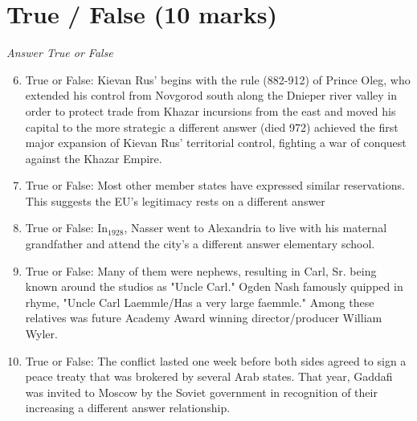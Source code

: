 \documentclass[12pt]{article}
\begin{document}
\section*{True / False (10 marks)}
\textit{Answer True or False}
\begin{enumerate}[label=\arabic*.]
\setcounter{enumi}{5}
\item True or False: Kievan Rus' begins with the rule (882-912) of Prince Oleg, who extended his control from Novgorod south along the Dnieper river valley in order to protect trade from Khazar incursions from the east and moved his capital to the more strategic a different answer (died 972) achieved the first major expansion of Kievan Rus' territorial control, fighting a war of conquest against the Khazar Empire.
\item True or False: Most other member states have expressed similar reservations. This suggests the EU's legitimacy rests on a different answer
\item True or False: In$_{1928}$, Nasser went to Alexandria to live with his maternal grandfather and attend the city's a different answer elementary school.
\item True or False: Many of them were nephews, resulting in Carl, Sr. being known around the studios as "Uncle Carl." Ogden Nash famously quipped in rhyme, "Uncle Carl Laemmle/Has a very large faemmle." Among these relatives was future Academy Award winning director/producer William Wyler.
\item True or False: The conflict lasted one week before both sides agreed to sign a peace treaty that was brokered by several Arab states. That year, Gaddafi was invited to Moscow by the Soviet government in recognition of their increasing a different answer relationship.
\end{enumerate}
\end{document}
